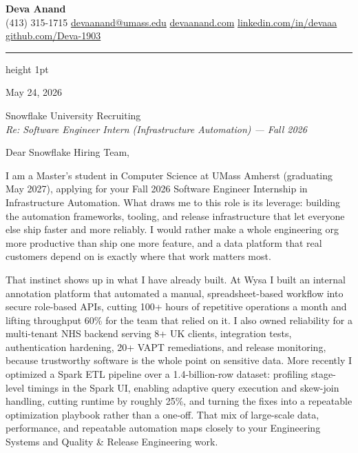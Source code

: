 \documentclass[letterpaper,11pt]{article}
\begin{document}
\begin{center}
  {\LARGE \bfseries \textcolor{ResumeNavy}{Deva Anand}} \\ \vspace{3pt}
  \small
  (413) 315-1715 \enspace\textbar\enspace
  \href{mailto:devaanand@umass.edu}{devaanand@umass.edu} \enspace\textbar\enspace
  \href{https://devaanand.com}{devaanand.com} \enspace\textbar\enspace
  \href{https://linkedin.com/in/devaaa/}{linkedin.com/in/devaaa} \enspace\textbar\enspace
  \href{https://github.com/Deva-1903}{github.com/Deva-1903}
\end{center}
\vspace{4pt}
{\color{ResumeNavy}\hrule height 1pt}
\vspace{12pt}

May 24, 2026

Snowflake University Recruiting \\
{\color{ResumeSlate}\textit{Re: Software Engineer Intern (Infrastructure Automation) --- Fall 2026}}

\vspace{4pt}

Dear Snowflake Hiring Team,

I am a Master's student in Computer Science at UMass Amherst (graduating May 2027), applying for your Fall 2026 Software Engineer Internship in Infrastructure Automation. What draws me to this role is its leverage: building the automation frameworks, tooling, and release infrastructure that let everyone else ship faster and more reliably. I would rather make a whole engineering org more productive than ship one more feature, and a data platform that real customers depend on is exactly where that work matters most.

That instinct shows up in what I have already built. At Wysa I built an internal annotation platform that automated a manual, spreadsheet-based workflow into secure role-based APIs, cutting 100+ hours of repetitive operations a month and lifting throughput 60\% for the team that relied on it. I also owned reliability for a multi-tenant NHS backend serving 8+ UK clients, integration tests, authentication hardening, 20+ VAPT remediations, and release monitoring, because trustworthy software is the whole point on sensitive data. More recently I optimized a Spark ETL pipeline over a 1.4-billion-row dataset: profiling stage-level timings in the Spark UI, enabling adaptive query execution and skew-join handling, cutting runtime by roughly 25\%, and turning the fixes into a repeatable optimization playbook rather than a one-off. That mix of large-scale data, performance, and repeatable automation maps closely to your Engineering Systems and Quality \& Release Engineering work.
\end{document}
